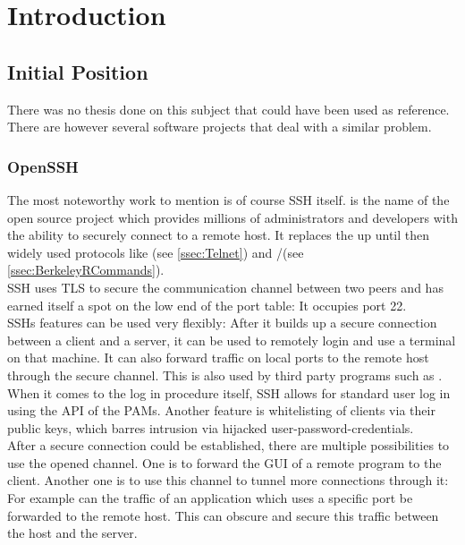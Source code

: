 \documentclass[10pt,a4paper,titlepage,twoside,english,final]{zhawreprt}
\begin{document}
\makedeclarationoforiginality

\tableofcontents

\chapter{Introduction}\label{chp:Introduction}
\section{Initial Position}\label{sec:InitialPosition}
There was no thesis done on this subject that could have been used as reference. There are however several software projects that deal with a similar problem.

\subsection{OpenSSH}\label{ssec:OpenSSH}
The most noteworthy work to mention is of course \gls{SSH} itself. \cite{openssh} is the name of the open source project which provides millions of administrators and developers with the ability to securely connect to a remote host. It replaces the up until then widely used protocols like \cite{telnet}(see \ref{ssec:Telnet}) and \cite{rlogin}/\cite{rsh}(see \ref{ssec:BerkeleyRCommands}).\\
\gls{SSH} uses \gls{TLS} to secure the communication channel between two peers and has earned itself a spot on the low end of the \gls{port} table: It occupies \gls{port} 22.\\
\gls{SSH}s features can be used very flexibly: After it builds up a secure connection between a client and a server, it can be used to remotely login and use a terminal on that machine.
It can also forward traffic on local ports to the remote host through the secure channel. This is also used by third party programs such as \cite{rsync}.\\
When it comes to the log in procedure itself, \gls{SSH} allows for standard user log in using the \gls{API} of the \glspl{PAM}. Another feature is whitelisting of clients via their public keys, which barres intrusion via hijacked user-password-credentials.\\
After a secure connection could be established, there are multiple possibilities to use the opened channel. One is to forward the \gls{GUI} of a remote program to the client. Another one is to use this channel to tunnel more connections through it: For example can the traffic of an application which uses a specific \gls{port} be forwarded to the remote host. This can obscure and secure this traffic between the host and the server.
\end{document}

